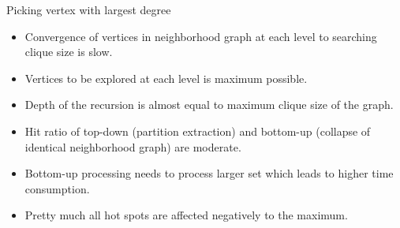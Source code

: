 \documentclass[landscape]{slides}
\begin{document}
\begin{slide}
	\begin{center}{\large Picking vertex with largest degree}\end{center}
	\small
	\begin{itemize}
		\setlength{\itemsep}{0pt}
		\setlength{\parskip}{20pt}
		\setlength{\parsep}{0pt}
		\item Convergence of vertices in neighborhood graph at each level to searching clique size is slow.
		\item Vertices to be explored at each level is maximum possible.
		\item Depth of the recursion is almost equal to maximum clique size of the graph.
		\item Hit ratio of top-down (partition extraction) and bottom-up (collapse of identical neighborhood graph) are moderate.
		\item Bottom-up processing needs to process larger set which leads to higher time consumption.
		\item Pretty much all hot spots are affected negatively to the maximum.
	\end{itemize}
\end{slide}


\begin{slide}
\end{slide}
\end{document}
